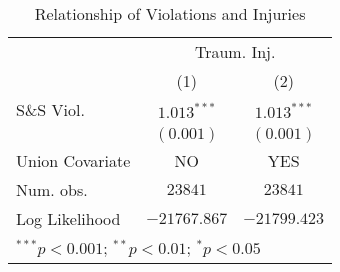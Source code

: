 
\begin{table}
\begin{center}
\begin{tabular}{l c c}
\hline
 & \multicolumn{2}{c}{Traum. Inj.} \\
\cline{2-3}
 & (1) & (2) \\
\hline
S\&S Viol.      & $1.013^{***}$ & $1.013^{***}$ \\
                & $(0.001)$     & $(0.001)$     \\
\hline
Union Covariate & NO            & YES           \\
Num. obs.       & $23841$       & $23841$       \\
Log Likelihood  & $-21767.867$  & $-21799.423$  \\
\hline
\multicolumn{3}{l}{\scriptsize{$^{***}p<0.001$; $^{**}p<0.01$; $^{*}p<0.05$}}
\end{tabular}
\caption{Relationship of Violations and Injuries}
\label{irr_traminj_ssviol}
\end{center}
\end{table}

